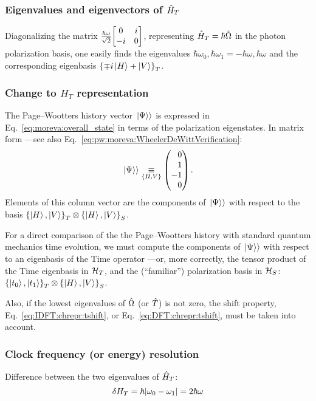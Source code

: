 \subsubsection*{Eigenvalues and eigenvectors of $\hat{H}_T$}

Diagonalizing the matrix $\frac{\hbar\omega}{\sqrt{2}}\mqty[0 &i\\-i &0]$,
representing $\hat{H}_T = \hbar\hat{\Omega}$ in the photon polarization basis,
one easily finds the eigenvalues $\hbar\omega_0, \hbar\omega_1 = -\hbar\omega, \hbar\omega$ and the corresponding eigenbasis
$\left\{\mp i \ket{H} + \ket{V}\right\}_T$.

\subsubsection*{Change to $H_T$ representation}

The Page--Wootters history vector $\left.\left| \Psi \right\rangle\right\rangle$ is expressed in Eq.~\eqref{eq:moreva:overall_state}
in terms of the polarization eigenstates. In matrix form ---see also Eq.~\eqref{eq:pw:moreva:WheelerDeWittVerification}:
\begin{equation}
  \dket{\Psi} \repr[\setof{H, V}]
  \begin{pmatrix*}[r]
    0 \\ 1 \\ -1 \\ 0
  \end{pmatrix*}
  \text{.}
\end{equation}
Elements of this column vector are the components of $\left.\left| \Psi \right\rangle\right\rangle$
with respect to the basis $\left\{\ket{H}, \ket{V}\right\}_T \otimes \left\{\ket{H}, \ket{V}\right\}_S$.

For a direct comparison of the the Page--Wootters history with standard quantum mechanics time evolution,
we must compute the components of $\left.\left| \Psi \right\rangle\right\rangle$ with respect to an eigenbasis of the Time operator
---or, more correctly, the tensor product of the Time eigenbasis in $\mathcal{H}_T$,
and the (``familiar'') polarization basis in $\mathcal{H}_S$: $\left\{\ket{t_0}, \ket{t_1}\right\}_T \otimes \left\{\ket{H}, \ket{V}\right\}_S$.

Also, if the lowest eigenvalues of $\hat{\Omega}$ (or $\hat{T}$) is not zero,
the shift property, Eq.~\eqref{eq:IDFT:chrepr:tshift}, or Eq.~\eqref{eq:DFT:chrepr:tshift},
must be taken into account.

\subsubsection*{Clock frequency (or energy) resolution}
Difference between the two eigenvalues of $\hat{H}_T$:
\begin{equation}
  \delta{H_T} = \hbar\qty|\omega_0 - \omega_1| = 2\hbar\omega
\end{equation}


